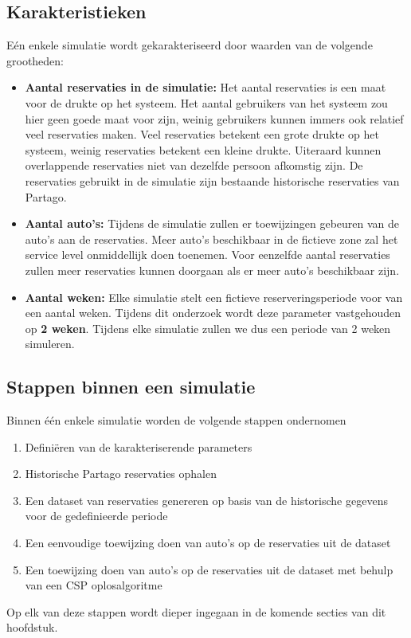 \subsection{Karakteristieken}
Eén enkele simulatie wordt gekarakteriseerd door waarden van de volgende grootheden:
\begin{itemize}
	\item \textbf{Aantal reservaties in de simulatie:}
	Het aantal reservaties is een maat voor de drukte op het systeem. Het aantal gebruikers van het systeem zou hier geen goede maat voor zijn, weinig gebruikers kunnen immers ook relatief veel reservaties maken. Veel reservaties betekent een grote drukte op het systeem, weinig reservaties betekent een kleine drukte. Uiteraard kunnen overlappende reservaties niet van dezelfde persoon afkomstig zijn. De reservaties gebruikt in de simulatie zijn bestaande historische reservaties van Partago.
	\item \textbf{Aantal auto's:}
	Tijdens de simulatie zullen er toewijzingen gebeuren van de auto's aan de reservaties. Meer auto's beschikbaar in de fictieve zone zal het service level onmiddellijk doen toenemen. Voor eenzelfde aantal reservaties zullen meer reservaties kunnen doorgaan als er meer auto's beschikbaar zijn. 
	\item \textbf{Aantal weken:}
	Elke simulatie stelt een fictieve reserveringsperiode voor van een aantal weken. Tijdens dit onderzoek wordt deze parameter vastgehouden op \textbf{2 weken}. Tijdens elke simulatie zullen we dus een periode van 2 weken simuleren. 
\end{itemize} 

\subsection{Stappen binnen een simulatie}
Binnen één enkele simulatie worden de volgende stappen ondernomen
\begin{enumerate}
	\item Definiëren van de karakteriserende parameters
	\item Historische Partago reservaties ophalen
	\item Een dataset van reservaties genereren op basis van de historische gegevens voor de gedefinieerde periode
	\item Een eenvoudige toewijzing doen van auto's op de reservaties uit de dataset
	\item Een toewijzing doen van auto's op de reservaties uit de dataset met behulp van een CSP oplosalgoritme 
	
\end{enumerate}
Op elk van deze stappen wordt dieper ingegaan in de komende secties van dit hoofdstuk. 

